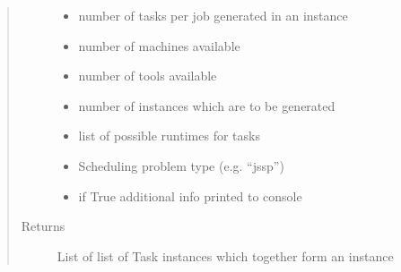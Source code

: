 \documentclass[letterpaper,10pt,english]{sphinxmanual}
\begin{document}
\begin{fulllineitems}
\begin{fulllineitems}
\begin{quote}
\begin{description}
\begin{itemize}
\item {} 
\sphinxAtStartPar
{} \textendash{} number of tasks per job generated in an instance

\item {} 
\sphinxAtStartPar
{} \textendash{} number of machines available

\item {} 
\sphinxAtStartPar
{} \textendash{} number of tools available

\item {} 
\sphinxAtStartPar
{} \textendash{} number of instances which are to be generated

\item {} 
\sphinxAtStartPar
{} \textendash{} list of possible runtimes for tasks

\item {} 
\sphinxAtStartPar
{} \textendash{} Scheduling problem type (e.g. “jssp”)

\item {} 
\sphinxAtStartPar
{} \textendash{} if True additional info printed to console

\end{itemize}

\item[{Returns}] \leavevmode
\sphinxAtStartPar
List of list of Task instances which together form an instance

\end{description}\end{quote}

\end{fulllineitems}



\end{fulllineitems}
\end{document}
